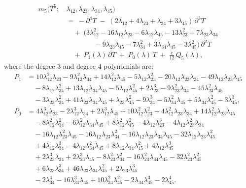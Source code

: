 \documentclass[11pt]{article}
\begin{document}
\begin{equation}\label{eq:m5-rectified}
\begin{aligned}
m_5(T^5;\,
  &\lambda_{12},\lambda_{23},\lambda_{34},\lambda_{45})
\\[2pt]
&=\;
-\partial^4 T
\;-\;
(2\lambda_{12} + 4\lambda_{23}
  + \lambda_{34} + 3\lambda_{45})\,\partial^3 T
\\[2pt]
&\quad +\;
(3\lambda_{12}^2 - 16\lambda_{12}\lambda_{23}
  - 6\lambda_{12}\lambda_{45}
  - 13\lambda_{23}^2 + 7\lambda_{23}\lambda_{34}
\\
&\qquad\qquad
  - 9\lambda_{23}\lambda_{45}
  - 7\lambda_{34}^2
  + 3\lambda_{34}\lambda_{45}
  - 3\lambda_{45}^2)\,\partial^2 T
\\[2pt]
&\quad +\; P_1(\lambda)\,\partial T
\;+\; P_0(\lambda)\, T
\;+\; \tfrac{c}{12}\, Q_5(\lambda),
\end{aligned}
\end{equation}
where the degree-$3$ and degree-$4$ polynomials are:
\begin{align*}
P_1
&=
10\lambda_{12}^2\lambda_{23}
- 9\lambda_{12}^2\lambda_{34}
+ 14\lambda_{12}^2\lambda_{45}
- 5\lambda_{12}\lambda_{23}^2
- 20\lambda_{12}\lambda_{23}\lambda_{34}
- 49\lambda_{12}\lambda_{23}\lambda_{45}
\\
&\quad
- 8\lambda_{12}\lambda_{34}^2
+ 13\lambda_{12}\lambda_{34}\lambda_{45}
- 5\lambda_{12}\lambda_{45}^2
+ 2\lambda_{23}^3
- 9\lambda_{23}^2\lambda_{34}
- 45\lambda_{23}^2\lambda_{45}
\\
&\quad
- 3\lambda_{23}\lambda_{34}^2
+ 41\lambda_{23}\lambda_{34}\lambda_{45}
+ \lambda_{23}\lambda_{45}^2
- 9\lambda_{34}^3
- 5\lambda_{34}^2\lambda_{45}
+ 5\lambda_{34}\lambda_{45}^2
- 3\lambda_{45}^3,
\\[6pt]
P_0
&=
4\lambda_{12}^3\lambda_{23}
- 2\lambda_{12}^3\lambda_{34}
+ 2\lambda_{12}^3\lambda_{45}
+ 10\lambda_{12}^2\lambda_{23}^2
- 4\lambda_{12}^2\lambda_{23}\lambda_{34}
+ 14\lambda_{12}^2\lambda_{23}\lambda_{45}
\\
&\quad
- 8\lambda_{12}^2\lambda_{34}^2
- 6\lambda_{12}^2\lambda_{34}\lambda_{45}
+ 8\lambda_{12}^2\lambda_{45}^2
- 4\lambda_{12}\lambda_{23}^3
- 4\lambda_{12}\lambda_{23}^2\lambda_{34}
\\
&\quad
- 16\lambda_{12}\lambda_{23}^2\lambda_{45}
- 16\lambda_{12}\lambda_{23}\lambda_{34}^2
- 16\lambda_{12}\lambda_{23}\lambda_{34}\lambda_{45}
- 32\lambda_{12}\lambda_{23}\lambda_{45}^2
\\
&\quad
+ 4\lambda_{12}\lambda_{34}^3
- 4\lambda_{12}\lambda_{34}^2\lambda_{45}
+ 8\lambda_{12}\lambda_{34}\lambda_{45}^2
+ 4\lambda_{12}\lambda_{45}^3
\\
&\quad
+ 2\lambda_{23}^3\lambda_{34}
+ 2\lambda_{23}^3\lambda_{45}
- 8\lambda_{23}^2\lambda_{34}^2
- 16\lambda_{23}^2\lambda_{34}\lambda_{45}
- 32\lambda_{23}^2\lambda_{45}^2
\\
&\quad
+ 6\lambda_{23}\lambda_{34}^3
+ 46\lambda_{23}\lambda_{34}\lambda_{45}^2
+ 2\lambda_{23}\lambda_{45}^3
\\
&\quad
- 2\lambda_{34}^4
- 16\lambda_{34}^3\lambda_{45}
+ 10\lambda_{34}^2\lambda_{45}^2
- 2\lambda_{34}\lambda_{45}^3
- 2\lambda_{45}^4.
\end{align*}
\end{document}
